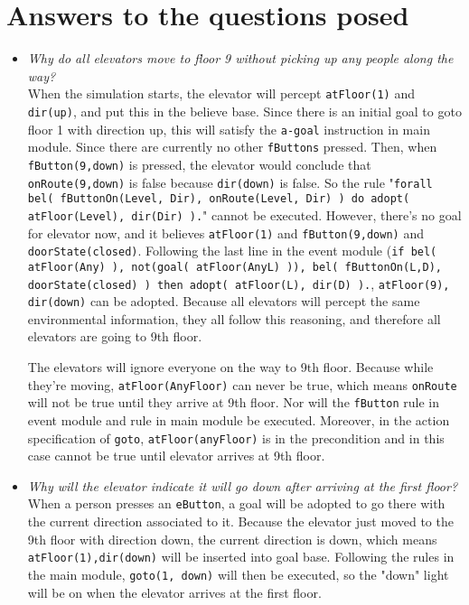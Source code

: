 \documentclass[a4paper,11pt,twocolumn]{article}
\begin{document}
\section{Answers to the questions posed}
\begin{itemize}
 \item \emph{Why do all elevators move to floor 9 without picking up any people along the way?}\\
 When the simulation starts, the elevator will percept \texttt{atFloor(1)} and \texttt{dir(up)}, and put this in the believe base. Since there is an initial goal to goto floor 1 with direction up, this will satisfy the \texttt{a-goal} instruction in main module. Since there are currently no other \texttt{fButtons} pressed. 
 Then, when \texttt{fButton(9,down)} is pressed, the elevator would conclude that \texttt{onRoute(9,down)} is false because \texttt{dir(down)} is false. So the rule "\texttt{forall bel( fButtonOn(Level, Dir), onRoute(Level, Dir) ) do adopt( atFloor(Level), dir(Dir) ).}" cannot be executed. However, there's no goal for elevator now, and it believes \texttt{atFloor(1)} and \texttt{fButton(9,down)} and \texttt{doorState(closed)}. Following the last line in the event module (\texttt{if bel( atFloor(Any) ), not(goal( atFloor(AnyL) )), bel( fButtonOn(L,D), doorState(closed) )
then adopt( atFloor(L), dir(D) ).}, \texttt{atFloor(9), dir(down)} can be adopted. 
Because all elevators will percept the same environmental information, they all follow this reasoning, and therefore all elevators are going to 9th floor. 

 The elevators will ignore everyone on the way to 9th floor. Because while they're moving, \texttt{atFloor(AnyFloor)} can never be true, which means \texttt{onRoute} will not be true until they arrive at 9th floor. Nor will the \texttt{fButton} rule in event module and rule in main module be executed. Moreover, in the action specification of \texttt{goto}, \texttt{atFloor(anyFloor)} is in the precondition and in this case cannot be true until elevator arrives at 9th floor.
 
 \item \emph{Why will the elevator indicate it will go down after arriving at the first floor?}\\
 When a person presses an \texttt{eButton}, a goal will be adopted to go there with the current direction associated to it. Because the elevator just moved to the 9th floor with direction down, the current direction is down, which means \texttt{atFloor(1),dir(down)} will be inserted into goal base. Following the rules in the main module, \texttt{goto(1, down)} will then be executed, so the "down" light will be on when the elevator arrives at the first floor.
 

\end{itemize}
\end{document}
